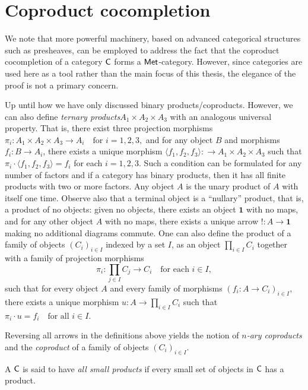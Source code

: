 




\section{Coproduct cocompletion} \label{sec:Coproduct_cocompletion}



We note that more powerful machinery, based on advanced categorical structures such as presheaves, can be employed to address the fact that the coproduct cocompletion of a category $\mathsf{C}$ forms a $\mathsf{Met}$-category. However, since categories are used here as a tool rather than the main focus of this thesis, the elegance of the proof is not a primary concern.


Up until how we have only discussed binary products/coproducts. However, we can also define \emph{ternary products}\(A_1 \times A_2 \times A_3\) with an analogous universal property. That is, there exist three projection morphisms
$\pi_i : A_1 \times A_2 \times A_3 \to A_i \quad \text{for } i = 1, 2, 3,$
and for any object \(B\) and morphisms \(f_i : B \to A_i\), there exists a unique morphism $\langle f_1, f_2, f_3 \rangle  : \to A_1 \times A_2 \times A_3$ such that \(\pi_i \cdot \langle f_1, f_2, f_3 \rangle = f_i\) for each \(i = 1, 2, 3\). Such a condition can be formulated for any number of factors and if a category has binary products, then it has all finite products with two or more factors. Any object $A$ is the unary product of $A$ with itself one time. Observe also that a terminal object is a ``nullary'' product, that is, a product of no objects: given no objects, there exists an object $\mathbf{1}$ with no maps, and for any other object $A$ with no maps, there exists a unique arrow $!: A \to \mathbf{1}$ making no additional diagrams commute. One can also define the product of a family of objects \((C_i)_{i \in I}\) indexed by a set \(I\), as an object $\prod_{i \in I} C_i$
together with a family of projection morphisms
\[
\pi_i : \prod_{j \in I} C_j \to C_i \quad \text{for each } i \in I,
\]
such that for every object \(A\) and every family of morphisms \((f_i : A \to C_i)_{i \in I}\), there exists a unique morphism $u : A \to \prod_{i \in I} C_i$ such that $\pi_i \cdot u = f_i \quad \text{for all } i \in I$.
 
Reversing all arrows in the definitions above yields the notion of \emph{$n$-ary coproducts} and the \emph{coproduct} of a family of objects $(C_i)_{i \in I}$.

\begin{definition}
A \(\mathsf{C}\) is said to have \emph{all small products} if every small set of objects in \(\mathsf{C}\) has a product.
\end{definition}


